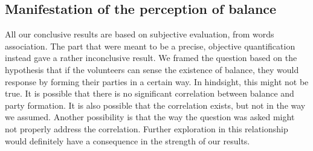 \subsection{Manifestation of the perception of balance}

All our conclusive results are based on subjective evaluation, from words association. The part that were meant to be a precise, objective quantification instead gave a rather inconclusive result. We framed the question based on the hypothesis that if the volunteers can sense the existence of balance, they would response by forming their parties in a certain way. In hindsight, this might not be true. It is possible that there is no significant correlation between balance and party formation. It is also possible that the correlation exists, but not in the way we assumed. Another possibility is that the way the question was asked might not properly address the correlation. Further exploration in this relationship would definitely have a consequence in the strength of our results.